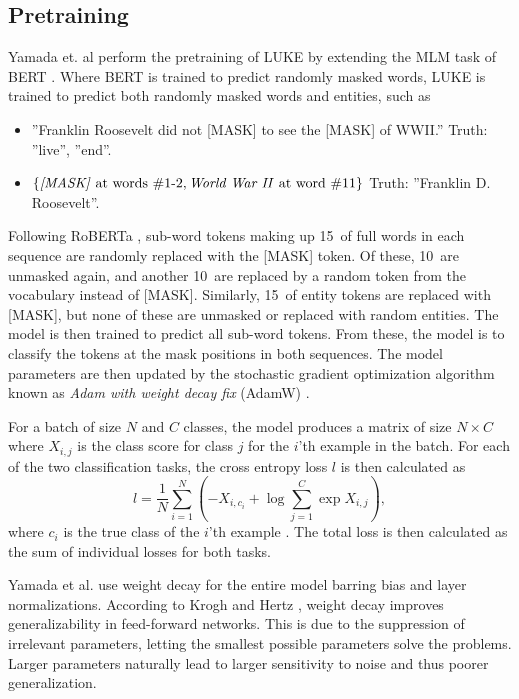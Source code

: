 \documentclass[main.tex]{subfiles}
\begin{document}
\subsection{Pretraining}
Yamada et. al perform the pretraining of LUKE by extending the MLM task of BERT \cite{devlin2019bert}.
Where BERT is trained to predict randomly masked words, LUKE is trained to predict both randomly masked words and entities, such as
\begin{itemize}
    \item ''Franklin Roosevelt did not [MASK] to see the [MASK] of WWII.''
        \subitem Truth: ''live'', ''end''.
    \item $\{\text{\emph{[MASK]} at words \#1-2}, \text{\emph{World War II} at word \#11}\}$
        \subitem Truth: ''Franklin D. Roosevelt''.
\end{itemize}
Following RoBERTa \cite{liu2019roberta}, sub-word tokens making up 15\pro\ of full words in each sequence are randomly replaced with the [MASK] token.
Of these, 10\pro\ are unmasked again, and another 10\pro\ are replaced by a random token from the vocabulary instead of [MASK].
Similarly, 15\pro\ of entity tokens are replaced with [MASK], but none of these are unmasked or replaced with random entities.
The model is then trained to predict all sub-word tokens.
From these, the model is to classify the tokens at the mask positions in both sequences.
The model parameters are then updated by the stochastic gradient optimization algorithm known as \emph{Adam with weight decay fix} (AdamW) \cite{hutter2019adamw}.

For a batch of size $ N $ and $ C $ classes, the model produces a matrix of size $ N\times C $ where $ X_{i, j} $ is the class score for class $ j $ for the $ i $'th example in the batch.
For each of the two classification tasks, the cross entropy loss $ l $ is then calculated as
\begin{equation}\label{eq:crossentropyloss}
    l = \frac{1}{N} \sum_{i=1}^N \left(
        -X_{i, c_i} + \log \sum_{j=1}^C \exp X_{i, j}
    \right),
\end{equation}
where $ c_i $ is the true class of the $ i $'th example \cite{pytorchcel}.
The total loss is then calculated as the sum of individual losses for both tasks.

Yamada et al. \cite{yamada2020luke} use weight decay for the entire model barring bias and layer normalizations.
According to Krogh and Hertz \cite{krogh1991weight}, weight decay improves generalizability in feed-forward networks.
This is due to the suppression of irrelevant parameters, letting the smallest possible parameters solve the problems.
Larger parameters naturally lead to larger sensitivity to noise and thus poorer generalization.
\end{document}
